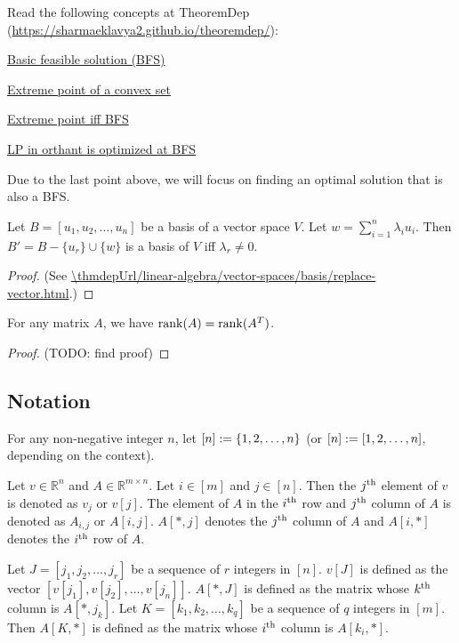 Read the following concepts at TheoremDep (\url{https://sharmaeklavya2.github.io/theoremdep/}):
\begin{tightemize}
\item \href{\thmdepUrl/convexity/polyhedra/bfs.html}{Basic feasible solution (BFS)}
\item \href{\thmdepUrl/convexity/extreme-point.html}{Extreme point of a convex set}
\item \href{\thmdepUrl/convexity/polyhedra/extreme-point-iff-bfs.html}{Extreme point iff BFS}
\item \href{\thmdepUrl/convexity/polyhedra/orth-lp.html}{LP in orthant is optimized at BFS}
\end{tightemize}
Due to the last point above, we will focus on finding an optimal solution that is also a BFS.

\begin{lemma}
\label{thm:replace-vector-in-basis}
Let $B = [u_1, u_2, \ldots, u_n]$ be a basis of a vector space $V$.
Let $w = \sum_{i=1}^n \lambda_i u_i$.
Then $B' = B - \{u_r\} \cup \{w\}$ is a basis of $V$ iff $\lambda_r \neq 0$.
\end{lemma}
\begin{proof}
(See \url{\thmdepUrl/linear-algebra/vector-spaces/basis/replace-vector.html}.)
\end{proof}

\begin{lemma}
For any matrix $A$, we have $\operatorname{rank}(A) = \operatorname{rank}(A^T)$.
\end{lemma}
\begin{proof}
(TODO: find proof)
\end{proof}

\subsection{Notation}

For any non-negative integer $n$, let $[n] := \{1, 2, \ldots, n\}$
(or $[n] := [1, 2, \ldots, n]$, depending on the context).

Let $v \in \mathbb{R}^n$ and $A \in \mathbb{R}^{m \times n}$.
Let $i \in [m]$ and $j \in [n]$.
Then the $j^{\textrm{th}}$ element of $v$ is denoted as $v_j$ or $v[j]$.
The element of $A$ in the $i^{\textrm{th}}$ row and $j^{\textrm{th}}$ column of $A$ is denoted as
$A_{i,j}$ or $A[i,j]$. $A[*,j]$ denotes the $j^{\textrm{th}}$ column of $A$ and
$A[i, *]$ denotes the $i^{\textrm{th}}$ row of $A$.

Let $J = [j_1, j_2, \ldots, j_r]$ be a sequence of $r$ integers in $[n]$.
$v[J]$ is defined as the vector $[v[j_1], v[j_2], \ldots, v[j_n]]$.
$A[*,J]$ is defined as the matrix whose $k^{\textrm{th}}$ column is $A[*,j_k]$.
Let $K = [k_1, k_2, \ldots, k_q]$ be a sequence of $q$ integers in $[m]$.
Then $A[K,*]$ is defined as the matrix whose $i^{\textrm{th}}$ column is $A[k_i,*]$.

